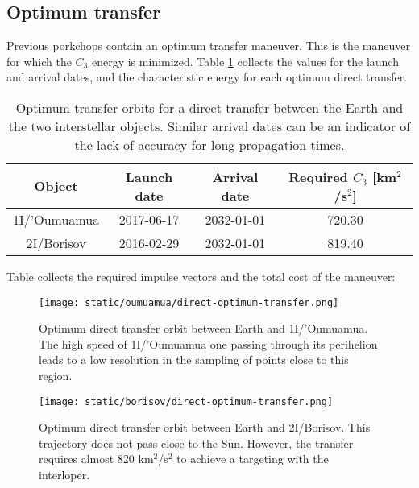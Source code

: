 \subsection{Optimum transfer}

Previous porkchops contain an optimum transfer maneuver. This is the maneuver
for which the $C_3$ energy is minimized. Table \ref{tab:direct-transfer-optimum}
collects the values for the launch and arrival dates, and the
characteristic energy for each optimum direct transfer.

\begin{table}[H]
  \centering
  \begin{tabular}{|c|c|c|c|}
    \hline
    Object       & Launch date & Arrival date & Required $C_3$ [km$^2$/s$^2$] \\
    \hline
    1I/'Oumuamua & 2017-06-17  & 2032-01-01   & 720.30                        \\
    2I/Borisov   & 2016-02-29  & 2032-01-01   & 819.40                        \\
    \hline
  \end{tabular}
  \caption{Optimum transfer orbits for a direct transfer between the Earth and the
    two interstellar objects. Similar arrival dates can be an indicator of the
    lack of accuracy for long propagation times.}
  \label{tab:direct-transfer-optimum}
\end{table}

Table collects the required impulse vectors and the total cost of the maneuver:



\begin{figure}[H]
  \centering
  \texttt{[image: static/oumuamua/direct-optimum-transfer.png]}
  \caption{Optimum direct transfer orbit between Earth and 1I/'Oumuamua. The
    high speed of 1I/'Oumuamua one passing through its perihelion leads to a low
    resolution in the sampling of points close to this region.}
  \label{fig:oumuamua-direct-transfer-orbit}
\end{figure}



\begin{figure}[H]
  \centering
  \texttt{[image: static/borisov/direct-optimum-transfer.png]}
  \caption{Optimum direct transfer orbit between Earth and 2I/Borisov. This
    trajectory does not pass close to the Sun. However, the transfer requires almost $820$
    km$^2$/s$^2$ to achieve a targeting with the interloper.}
  \label{fig:borisov-direct-transfer-orbit}
\end{figure}
